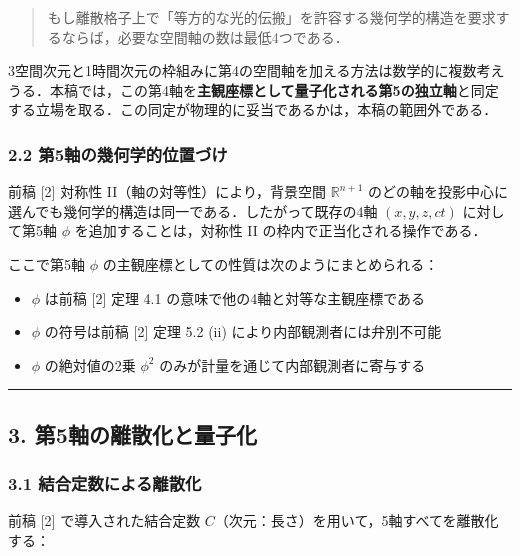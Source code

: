 \documentclass[a4paper,11pt]{ltjsarticle}
\theoremstyle{definition}
\begin{document}
\begin{quote}
もし離散格子上で「等方的な光的伝搬」を許容する幾何学的構造を要求するならば，必要な空間軸の数は最低4つである．
\end{quote}

3空間次元と1時間次元の枠組みに第4の空間軸を加える方法は数学的に複数考えうる．本稿では，この第4軸を\textbf{主観座標として量子化される第5の独立軸}と同定する立場を取る．この同定が物理的に妥当であるかは，本稿の範囲外である．

\subsubsection{2.2 第5軸の幾何学的位置づけ}\label{ux7b2c5ux8ef8ux306eux5e7eux4f55ux5b66ux7684ux4f4dux7f6eux3065ux3051}

前稿 {[}2{]} 対称性 II（軸の対等性）により，背景空間 \(\mathbb{R}^{n+1}\) のどの軸を投影中心に選んでも幾何学的構造は同一である．したがって既存の4軸 \((x, y, z, ct)\) に対して第5軸 \(\phi\) を追加することは，対称性 II の枠内で正当化される操作である．

ここで第5軸 \(\phi\) の主観座標としての性質は次のようにまとめられる：

\begin{itemize}
\tightlist
\item
  \(\phi\) は前稿 {[}2{]} 定理 4.1 の意味で他の4軸と対等な主観座標である
\item
  \(\phi\) の符号は前稿 {[}2{]} 定理 5.2 (ii) により内部観測者には弁別不可能
\item
  \(\phi\) の絶対値の2乗 \(\phi^2\) のみが計量を通じて内部観測者に寄与する
\end{itemize}

\begin{center}\rule{0.5\linewidth}{0.5pt}\end{center}

\subsection{3. 第5軸の離散化と量子化}\label{ux7b2c5ux8ef8ux306eux96e2ux6563ux5316ux3068ux91cfux5b50ux5316}

\subsubsection{3.1 結合定数による離散化}\label{ux7d50ux5408ux5b9aux6570ux306bux3088ux308bux96e2ux6563ux5316}

前稿 {[}2{]} で導入された結合定数 \(C\)（次元：長さ）を用いて，5軸すべてを離散化する：
\end{document}
